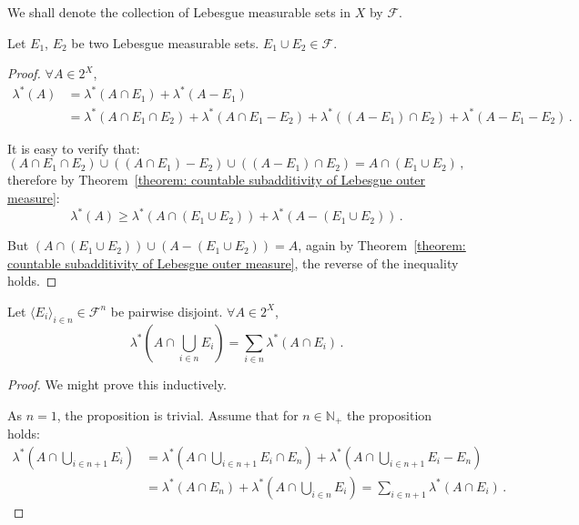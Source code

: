 \documentclass[openany]{book}
\begin{document}
We shall denote the collection of Lebesgue measurable sets in $X$ by $\mathscr F$.

\begin{theorem}
	\label{theorem: Lebesgue measurable sets is closed under finite unions}
	Let $E_1$, $E_2$ be two Lebesgue measurable sets. 
	$E_1 \cup E_2 \in \mathscr F$.
\end{theorem}
\begin{proof}
	$\forall A \in 2^X$, 
	\begin{align*}
		\lambda^*(A) 
			&= \lambda^*(A \cap E_1) + \lambda^*(A - E_1)
		\\
			&= \lambda^*(A \cap E_1 \cap E_2) + \lambda^*(A \cap E_1 - E_2)
		+ \lambda^*((A - E_1) \cap E_2) + \lambda^*(A - E_1 - E_2)\,.
	\end{align*}

	It is easy to verify that:
	\begin{equation*}
		(A \cap E_1 \cap E_2) \cup ((A \cap E_1) - E_2) \cup ((A - E_1) \cap E_2)
		= A \cap (E_1 \cup E_2)\,,
	\end{equation*}
	therefore by Theorem~\ref{theorem: countable subadditivity of Lebesgue outer measure}:
	\begin{equation*}
		\lambda^*(A) \geq \lambda^*(A \cap (E_1 \cup E_2)) + \lambda^*(A - (E_1 \cup E_2))\,.
	\end{equation*}

	But $(A \cap (E_1 \cup E_2)) \cup (A - (E_1 \cup E_2)) = A$, again by Theorem~\ref{theorem: countable subadditivity of Lebesgue outer measure}, the reverse of the inequality holds.
\end{proof}

\begin{theorem}
	\label{theorem: finite additivity of Lebesgue measure}
	Let $\langle E_i \rangle_{i \in n} \in \mathscr F^n$ be pairwise disjoint.
	$\forall A \in 2^X$, 
	\begin{equation*}
		\lambda^*\left(A \cap \bigcup_{i \in n} E_i \right)
		= \sum_{i \in n} \lambda^* (A \cap E_i)\,.
	\end{equation*}
\end{theorem}
\begin{proof}
	We might prove this inductively.

	As $n = 1$, the proposition is trivial. Assume that for $n \in \mathbb N_+$ the proposition holds:
	\begin{align*}
		\lambda^*\left( A \cap \bigcup_{i \in n + 1} E_i \right)
		&= \lambda^*\left( A \cap \bigcup_{i \in n + 1} E_i \cap E_n \right)
		+  \lambda^*\left( A \cap \bigcup_{i \in n + 1} E_i - E_n \right)
		\\
		&= \lambda^*( A \cap E_n ) + \lambda^*\left( A \cap \bigcup_{i \in n} E_i \right)
		= \sum_{i \in n + 1} \lambda^*(A \cap E_i)\,.
	\end{align*}
\end{proof}
\end{document}
